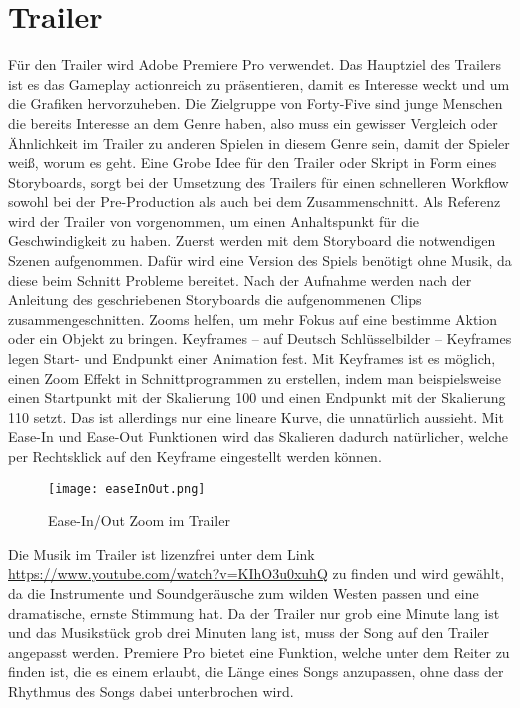 
\section{Trailer}\label{sec:trailer}

\renewcommand{\kapitelautor}{Autor: Markus Böheim}

Für den Trailer wird Adobe Premiere Pro verwendet. Das Hauptziel des Trailers
ist es das Gameplay actionreich zu präsentieren, damit es Interesse weckt und um die Grafiken hervorzuheben.
Die Zielgruppe von Forty-Five sind junge Menschen die bereits Interesse an dem Genre haben, also muss ein gewisser
Vergleich oder Ähnlichkeit im Trailer zu anderen Spielen in diesem Genre sein, damit der Spieler weiß, worum es geht.
Eine Grobe Idee für den Trailer oder Skript in Form eines Storyboards, sorgt bei der Umsetzung des Trailers für einen
schnelleren Workflow sowohl bei der Pre-Production als auch bei dem Zusammenschnitt.
Als Referenz wird der Trailer von  vorgenommen, um einen Anhaltspunkt für die Geschwindigkeit zu haben.
Zuerst werden mit dem Storyboard die notwendigen Szenen aufgenommen. Dafür wird eine Version des Spiels benötigt ohne Musik, da diese beim Schnitt Probleme bereitet. Nach der Aufnahme werden nach der Anleitung des geschriebenen Storyboards die aufgenommenen Clips zusammengeschnitten. Zooms helfen, um mehr Fokus auf eine bestimme Aktion oder ein Objekt zu bringen. Keyframes – auf Deutsch Schlüsselbilder – Keyframes legen Start- und Endpunkt einer Animation fest. Mit Keyframes ist es möglich, einen Zoom Effekt in Schnittprogrammen zu erstellen, indem man beispielsweise einen Startpunkt mit der Skalierung 100 und einen Endpunkt mit der Skalierung 110 setzt. Das ist allerdings nur eine lineare Kurve, die unnatürlich aussieht. Mit Ease-In und Ease-Out Funktionen wird das Skalieren dadurch natürlicher, welche per Rechtsklick auf den Keyframe eingestellt werden können.

\begin{figure}[H]
    \centering
    \texttt{[image: easeInOut.png]}
    \caption{Ease-In/Out Zoom im Trailer}
\end{figure}

Die Musik im Trailer ist lizenzfrei unter dem Link \url{https://www.youtube.com/watch?v=KIhO3u0xuhQ} zu finden und wird gewählt, da die Instrumente und Soundgeräusche zum wilden Westen passen und eine dramatische, ernste Stimmung hat. Da der Trailer nur grob eine Minute lang ist und das Musikstück grob drei Minuten lang ist, muss der Song auf den Trailer angepasst werden.
Premiere Pro bietet eine  Funktion, welche unter dem 
Reiter zu finden ist, die es einem erlaubt, die Länge eines Songs anzupassen, ohne dass der Rhythmus des Songs dabei unterbrochen wird.

